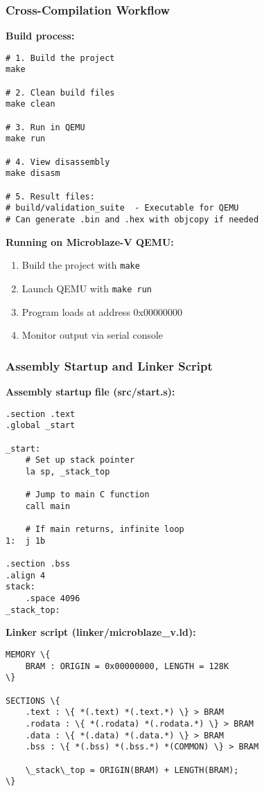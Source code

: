 \documentclass{beamer}
\begin{document}
\begin{frame}[fragile]
\frametitle{Cross-Compilation Workflow}
\textbf{Build process:}
\begin{verbatim}
# 1. Build the project
make

# 2. Clean build files
make clean

# 3. Run in QEMU
make run

# 4. View disassembly
make disasm

# 5. Result files:
# build/validation_suite  - Executable for QEMU
# Can generate .bin and .hex with objcopy if needed
\end{verbatim}

\textbf{Running on Microblaze-V QEMU:}
\begin{enumerate}
    \item Build the project with \texttt{make}
    \item Launch QEMU with \texttt{make run}
    \item Program loads at address 0x00000000
    \item Monitor output via serial console
\end{enumerate}
\end{frame}

\begin{frame}[fragile]
\frametitle{Assembly Startup and Linker Script}
\textbf{Assembly startup file (src/start.s):}
\begin{lstlisting}[language={[x86masm]Assembler}, basicstyle=\fontsize{6}{6}\selectfont\ttfamily]
.section .text
.global _start

_start:
    # Set up stack pointer
    la sp, _stack_top

    # Jump to main C function
    call main

    # If main returns, infinite loop
1:  j 1b

.section .bss
.align 4
stack:
    .space 4096
_stack_top:
\end{lstlisting}

\textbf{Linker script (linker/microblaze\_v.ld):}
\begin{lstlisting}[basicstyle=\fontsize{6}{6}\selectfont\ttfamily]
MEMORY \{
    BRAM : ORIGIN = 0x00000000, LENGTH = 128K
\}

SECTIONS \{
    .text : \{ *(.text) *(.text.*) \} > BRAM
    .rodata : \{ *(.rodata) *(.rodata.*) \} > BRAM
    .data : \{ *(.data) *(.data.*) \} > BRAM
    .bss : \{ *(.bss) *(.bss.*) *(COMMON) \} > BRAM

    \_stack\_top = ORIGIN(BRAM) + LENGTH(BRAM);
\}
\end{lstlisting}
\end{frame}
\end{document}

